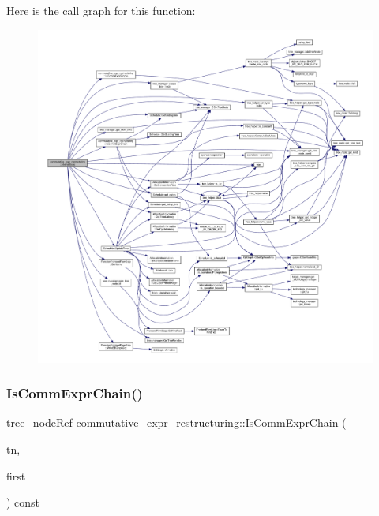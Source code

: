 Here is the call graph for this function\+:
\nopagebreak
\begin{figure}[H]
\begin{center}
\leavevmode
\includegraphics[width=350pt]{db/d8c/classcommutative__expr__restructuring_adbf4a35cb5e3a0a7be1abe3aca2f46bf_cgraph}
\end{center}
\end{figure}
\mbox{\label{classcommutative__expr__restructuring_a699aee44ff4dc9e16eb2200218fac8f0}} 
\subsubsection{\texorpdfstring{Is\+Comm\+Expr\+Chain()}{IsCommExprChain()}}
{\footnotesize\ttfamily \hyperlink{tree__node_8hpp_a6ee377554d1c4871ad66a337eaa67fd5}{tree\+\_\+node\+Ref} commutative\+\_\+expr\+\_\+restructuring\+::\+Is\+Comm\+Expr\+Chain (\begin{DoxyParamCaption}\item[{const \hyperlink{tree__node_8hpp_a3cf5d02292c940f3892425a5b5fdec3c}{tree\+\_\+node\+Const\+Ref}}]{tn,  }\item[{const bool}]{first }\end{DoxyParamCaption}) const\hspace{0.3cm}{\ttfamily [private]}}



